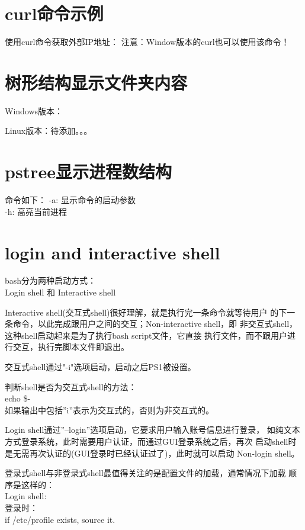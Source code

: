 ﻿\documentclass[a4paper,11pt]{article}
\begin{document}
  \section[curl命令示例]{curl命令示例}
  使用curl命令获取外部IP地址：
  注意：Window版本的curl也可以使用该命令！


  \section[树形结构显示文件夹内容]{树形结构显示文件夹内容}
  Windows版本：

  Linux版本：待添加。。。


  \section[pstree显示进程数结构]{pstree显示进程数结构}
  命令如下：
  -a: 显示命令的启动参数\\
  -h: 高亮当前进程


  \section[login and interactive shell]{login and interactive shell}
  bash分为两种启动方式：\\
  Login shell 和 Interactive shell

  Interactive shell(交互式shell)很好理解，就是执行完一条命令就等待用户
  的下一条命令，以此完成跟用户之间的交互；Non-interactive shell，即
  非交互式shell，这种shell启动起来是为了执行bash script文件，它直接
  执行文件，而不跟用户进行交互，执行完脚本文件即退出。

  交互式shell通过"-i"选项启动，启动之后PS1被设置。

  判断shell是否为交互式shell的方法：\\
  echo \$-\\
  如果输出中包括''i''表示为交互式的，否则为非交互式的。

  Login shell通过''--login''选项启动，它要求用户输入账号信息进行登录，
  如纯文本方式登录系统，此时需要用户认证，而通过GUI登录系统之后，再次
  启动shell时是无需再次认证的(GUI登录时已经认证过了)，此时就可以启动
  Non-login shell。

  登录式shell与非登录式shell最值得关注的是配置文件的加载，通常情况下加载
  顺序是这样的：\\
  Login shell:\\
  登录时：\\
  if /etc/profile exists, source it.
\end{document}
